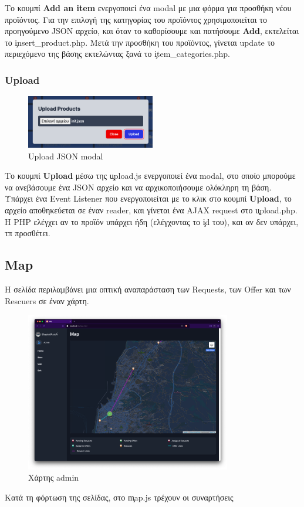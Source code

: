             Το κουμπί \textbf{Add an item} ενεργοποιεί ένα modal με μια φόρμα για προσθήκη νέου προϊόντος.
            Για την επιλογή της κατηγορίας του προϊόντος χρησιμοποιείται το προηγούμενο JSON αρχείο, και όταν το καθορίσουμε και πατήσουμε \textbf{Add}, εκτελείται το \c{insert\_product.php}.
            Μετά την προσθήκη του προϊόντος, γίνεται update το περιεχόμενο της βάσης εκτελώντας ξανά το \c{item\_categories.php}.

        \subsubsection{Upload}
            \begin{figure}[H] \noindent \centering
                \includegraphics[width=0.5\textwidth]{img/admin-base-upload}
                \caption{Upload JSON modal}
            \end{figure}

            Το κουμπί \textbf{Upload} μέσω της \c{upload.js} ενεργοποιεί ένα modal, στο οποίο μπορούμε να ανεβάσουμε ένα JSON αρχείο και να αρχικοποιήσουμε ολόκληρη τη βάση.
            Υπάρχει ένα Event Listener που ενεργοποιείται με το κλικ στο κουμπί \textbf{Upload}, το αρχείο αποθηκεύεται σε έναν reader, και γίνεται ένα AJAX request στο \c{upload.php}.
            Η PHP ελέγχει αν το προϊόν υπάρχει ήδη (ελέγχοντας το \c{id} του), και αν δεν υπάρχει, τπ προσθέτει.

        \subsection{Map}
            Η σελίδα περιλαμβάνει μια οπτική αναπαράσταση των Requests, των Offer και των Rescuers σε έναν χάρτη.

            \begin{figure}[H] \noindent \centering
                \includegraphics[width=0.8\textwidth]{img/admin-map}
                \caption{Χάρτης admin}
            \end{figure}

            Κατά τη φόρτωση της σελίδας, στο \c{map.js} τρέχουν οι συναρτήσεις